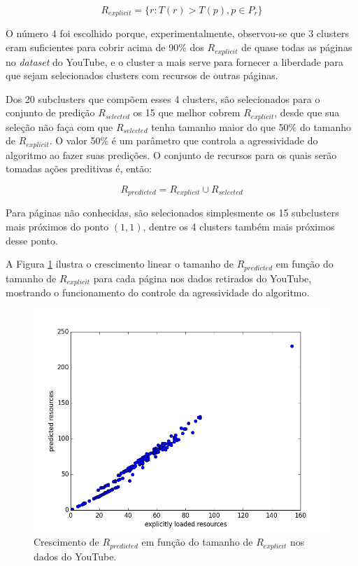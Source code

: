 \documentclass[10pt,twocolumn,letterpaper]{article}
\begin{document}
\begin{equation}
R_{explicit} = \{ r : T(r) > T(p), p \in P_{r} \}
\label{eqn-rexplicit}
\end{equation}

O número 4 foi escolhido porque, experimentalmente, observou-se que 3 clusters eram suficientes para cobrir acima de 90\% dos $R_{explicit}$ de quase todas as páginas no \emph{dataset} do YouTube, e o cluster a mais serve para fornecer a liberdade para que sejam selecionados clusters com recursos de outras páginas.

Dos 20 subclusters que compõem esses 4 clusters, são selecionados para o conjunto de predição $R_{selected}$ os 15 que melhor cobrem $R_{explicit}$, desde que sua seleção não faça com que $R_{selected}$ tenha tamanho maior do que 50\% do tamanho de $R_{explicit}$. O valor 50\% é um parâmetro que controla a agressividade do algoritmo ao fazer suas predições. O conjunto de recursos para os quais serão tomadas ações preditivas é, então:

\begin{equation}
R_{predicted} = R_{explicit} \cup R_{selected}
\end{equation}

Para páginas não conhecidas, são selecionados simplesmente os 15 subclusters mais próximos do ponto $(1, 1)$, dentre os 4 clusters também mais próximos desse ponto.

A Figura \ref{fig-youtube-explicit-vs-predicted} ilustra o crescimento linear o tamanho de $R_{predicted}$ em função do tamanho de $R_{explicit}$ para cada página nos dados retirados do YouTube, mostrando o funcionamento do controle da agressividade do algoritmo.

\begin{figure}
	\begin{center}
     \includegraphics[width=0.99\columnwidth]{pics/youtube_explicit_vs_predicted.png}
    \caption{Crescimento de $R_{predicted}$ em função do tamanho de $R_{explicit}$ nos dados do YouTube.}
    \label{fig-youtube-explicit-vs-predicted}   
	\end{center} 
\end{figure}
\end{document}
